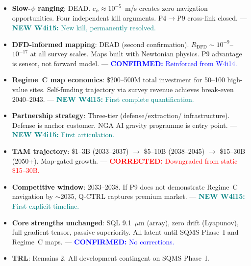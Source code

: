 \documentclass[11pt]{article}
\theoremstyle{definition}
\theoremstyle{remark}
\newcommand{\confirmed}[1]{\textcolor{blue}{\textbf{CONFIRMED:} #1}}
\newcommand{\corrected}[1]{\textcolor{red}{\textbf{CORRECTED:} #1}}
\newcommand{\newfinding}[1]{\textcolor{teal}{\textbf{NEW W4i15:} #1}}
\begin{document}
\begin{tcolorbox}[colback=green!5!white, colframe=green!40!black,
  title=\textbf{P9 Status: ALIVE --- Commercial Strategy Sharpened,
  Two New Negatives Confirmed}]
\begin{itemize}[nosep]
\item \textbf{Slow-$\psi$ ranging}: DEAD. $c_\psi \approx 10^{-5}$~m/s
  creates zero navigation opportunities. Four independent kill arguments.
  P4$\to$P9 cross-link closed. ---
  \newfinding{New kill, permanently resolved.}
\item \textbf{DFD-informed mapping}: DEAD (second confirmation).
  $R_{\mathrm{DFD}} \sim 10^{-9}$--$10^{-17}$ at all survey scales.
  Maps built with Newtonian physics. P9 advantage is sensor, not
  forward model. ---
  \confirmed{Reinforced from W4i14.}
\item \textbf{Regime~C map economics}: \$200--500M total investment
  for 50--100 high-value sites. Self-funding trajectory via survey
  revenue achieves break-even 2040--2043. ---
  \newfinding{First complete quantification.}
\item \textbf{Partnership strategy}: Three-tier (defense/extraction/
  infrastructure). Defense is anchor customer. NGA AI gravity
  programme is entry point. ---
  \newfinding{First articulation.}
\item \textbf{TAM trajectory}: \$1--3B (2033--2037) $\to$ \$5--10B
  (2038--2045) $\to$ \$15--30B (2050+). Map-gated growth. ---
  \corrected{Downgraded from static \$15--30B.}
\item \textbf{Competitive window}: 2033--2038. If P9 does not
  demonstrate Regime~C navigation by $\sim$2035, Q-CTRL captures
  premium market. ---
  \newfinding{First explicit timeline.}
\item \textbf{Core strengths unchanged}: SQL 9.1~$\mu$m (array),
  zero drift (Lyapunov), full gradient tensor, passive superiority.
  All latent until SQMS Phase~I and Regime~C maps. ---
  \confirmed{No corrections.}
\item \textbf{TRL}: Remains 2. All development contingent on SQMS
  Phase~I.
\end{itemize}
\end{tcolorbox}
\end{document}
